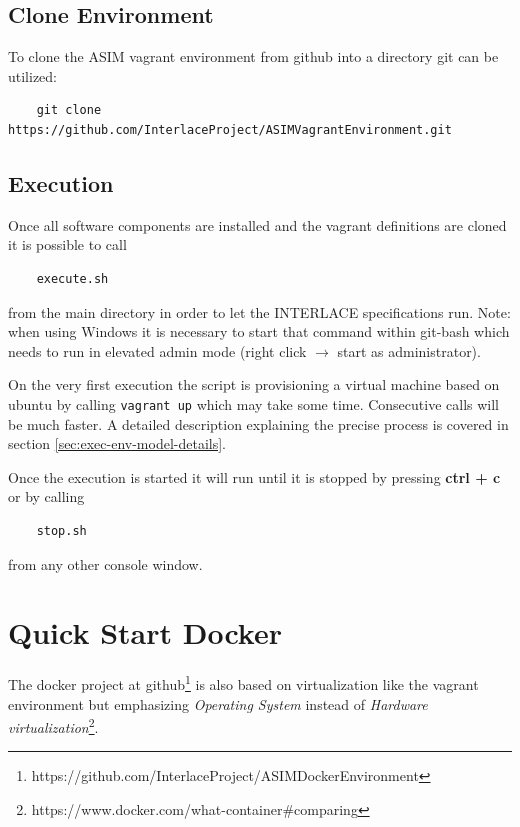 \subsection{Clone Environment}

To clone the ASIM vagrant environment from github into a directory git can be utilized:

\begin{lstlisting}
	git clone https://github.com/InterlaceProject/ASIMVagrantEnvironment.git
\end{lstlisting}

\subsection{Execution}

Once all software components are installed and the vagrant definitions are cloned it is possible to call

\begin{lstlisting}
	execute.sh
\end{lstlisting}

from the main directory in order to let the INTERLACE specifications run. Note: when using Windows it is necessary to start that command within git-bash which needs to run in elevated admin mode (right click $\rightarrow$ start as administrator).

On the very first execution the script is provisioning a virtual machine based on ubuntu by calling \texttt{vagrant up} which may take some time. Consecutive calls will be much faster. A detailed description explaining the precise process is covered in section \ref{sec:exec-env-model-details}.

Once the execution is started it will run until it is stopped by pressing \textbf{ctrl + c} or by calling

\begin{lstlisting}
	stop.sh
\end{lstlisting}

from any other console window.

\section{Quick Start Docker}
\label{sec:quick-start-docker}

The docker project at github\footnote{https://github.com/InterlaceProject/ASIMDockerEnvironment} is also based on virtualization like the vagrant environment but emphasizing \textit{Operating System} instead of \textit{Hardware virtualization}\footnote{https://www.docker.com/what-container\#comparing}.


